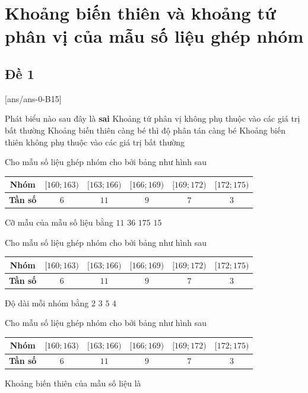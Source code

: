 \section{Khoảng biến thiên và khoảng tứ phân vị của mẫu số liệu ghép nhóm}
\subsection{Đề 1}
[ans/ans-0-B15]
\caulc
\begin{ex}%
 Phát biểu nào sau đây là \textbf{sai}
{Khoảng tứ phân vị không phụ thuộc vào các giá trị bất thường}
{Khoảng biến thiên càng bé thì độ phân tán càng bé}
{\True Khoảng biến thiên không phụ thuộc vào các giá trị bất thường}
\end{ex}
\begin{ex}%
Cho mẫu số liệu ghép nhóm cho bởi bảng như hình sau
\begin{center}
	\begin{tabular}{|c|c|c|c|c|c|}
		\hline
		\textbf{Nhóm} & $[160;163)$&$[163;166)$& $[166;169)$& $[169;172)$&$[172;175)$\\
		\hline
		\textbf{Tần số} & $6$ &$11$& $9$& $7$&$3$\\
		\hline
	\end{tabular}
\end{center}
Cỡ mẫu của mẫu số liệu bằng
\choice
{$11$}
{\True $36$}
{$175$}
{$15$}
\end{ex}
\begin{ex}%
Cho mẫu số liệu ghép nhóm cho bởi bảng như hình sau
	\begin{center}
		\begin{tabular}{|c|c|c|c|c|c|}
			\hline
			\textbf{Nhóm} & $[160;163)$&$[163;166)$& $[166;169)$& $[169;172)$&$[172;175)$\\
			\hline
			\textbf{Tần số} & $6$ &$11$& $9$& $7$&$3$\\
			\hline
		\end{tabular}
	\end{center}
Độ dài mỗi nhóm bằng
\choice
{$2$}
{\True $3$}
{$5$}
{$4$}
\end{ex}
\begin{ex}%
Cho mẫu số liệu ghép nhóm cho bởi bảng như hình sau
\begin{center}
	\begin{tabular}{|c|c|c|c|c|c|}
		\hline
		\textbf{Nhóm} & $[160;163)$&$[163;166)$& $[166;169)$& $[169;172)$&$[172;175)$\\
		\hline
		\textbf{Tần số} & $6$ &$11$& $9$& $7$&$3$\\
		\hline
	\end{tabular}
\end{center}
Khoảng biến thiên của mẫu số liệu là
\end{ex}

